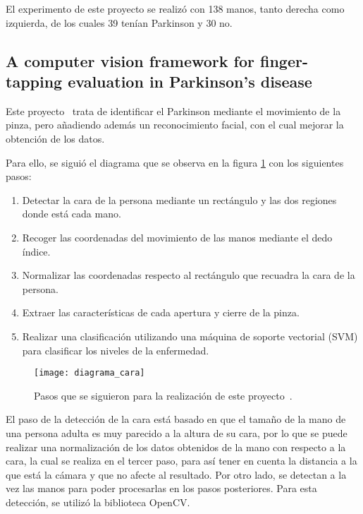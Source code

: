 El experimento de este proyecto se realizó con 138 manos, tanto derecha como izquierda, de los cuales 39 tenían Parkinson y 30 no.

\subsection{A computer vision framework for finger-tapping evaluation in Parkinson's disease}
Este proyecto~\cite{khan2014computer} trata de identificar el Parkinson mediante el movimiento de la pinza, pero añadiendo además un reconocimiento facial, con el cual mejorar la obtención de los datos.

Para ello, se siguió el diagrama que se observa en la figura \ref{fig:diagramacara} con los siguientes pasos:
 
\begin{enumerate}
	\item Detectar la cara de la persona mediante un rectángulo y las dos regiones donde está cada mano. 
	\item Recoger las coordenadas del movimiento de las manos mediante el dedo índice. 
	\item Normalizar las coordenadas respecto al rectángulo que recuadra la cara de la persona. 
	\item Extraer las características de cada apertura y cierre de la pinza. 
	\item Realizar una clasificación utilizando una máquina de soporte vectorial (SVM) para clasificar los niveles de la enfermedad.
\end{enumerate}

\begin{figure}[h]
	\texttt{[image: diagrama\_cara]}
	\caption[Pasos que se siguieron para la realización de este proyecto.]{Pasos que se siguieron para la realización de este proyecto~\cite{khan2014computer}.}
	\label{fig:diagramacara}
\end{figure}

El paso de la detección de la cara está basado en que el tamaño de la mano de una persona adulta es muy parecido a la altura de su cara, por lo que se puede realizar una normalización de los datos obtenidos de la mano con respecto a la cara, la cual se realiza en el tercer paso, para así tener en cuenta la distancia a la que está la cámara y que no afecte al resultado. Por otro lado, se detectan a la vez las manos para poder procesarlas en los pasos posteriores. Para esta detección, se utilizó la biblioteca OpenCV.

